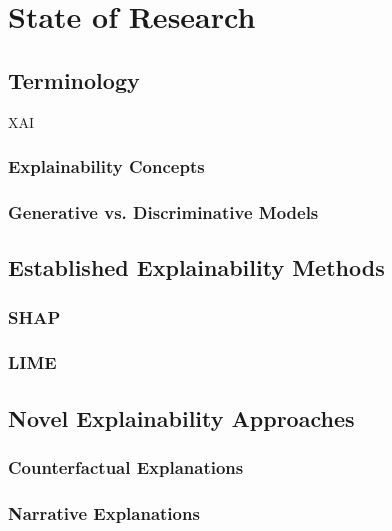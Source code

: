 \section{State of Research} \label{sec:state_of_research}

\subsection{Terminology} \label{ssec:terminology}

\ac{XAI}

\subsubsection{Explainability Concepts} \label{sssec:explainability_concepts}

\subsubsection{Generative vs. Discriminative Models} \label{ssec:generative_vs_discriminative_models}

\subsection{Established Explainability Methods} \label{ssec:established_explainability_methods}

\subsubsection{SHAP} \label{sssec:shap}

\subsubsection{LIME} \label{sssec:lime}

\subsection{Novel Explainability Approaches} \label{ssec:novel_explainability_approaches}

\subsubsection{Counterfactual Explanations} \label{sssec:counterfactual_explanations}

\subsubsection{Narrative Explanations} \label{sssec:narrative_explanations}


